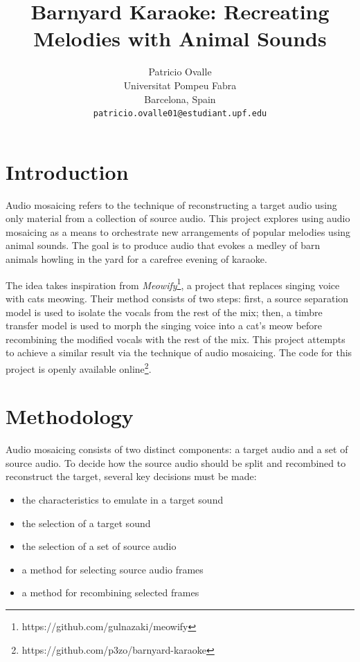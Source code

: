 \documentclass{article}
\title{Barnyard Karaoke: Recreating Melodies with Animal Sounds}
\date{}
\author{
	Patricio Ovalle \\
	Universitat Pompeu Fabra\\
	Barcelona, Spain \\
	\texttt{patricio.ovalle01@estudiant.upf.edu}
}
\begin{document}
\maketitle



\section{Introduction}

Audio mosaicing refers to the technique of reconstructing a target audio using only material from a collection of source audio.
This project explores using audio mosaicing as a means to orchestrate new arrangements of popular melodies using animal sounds.
The goal is to produce audio that evokes a medley of barn animals howling in the yard for a carefree evening of karaoke.

The idea takes inspiration from \textit{Meowify}\footnote{https://github.com/gulnazaki/meowify}, a project that replaces singing voice with cats meowing.
Their method consists of two steps: first, a source separation model is used to isolate the vocals from the rest of the mix; then, a timbre transfer model is used to morph the singing voice into a cat's meow before recombining the modified vocals with the rest of the mix.
This project attempts to achieve a similar result via the technique of audio mosaicing.
The code for this project is openly available online\footnote{https://github.com/p3zo/barnyard-karaoke}.

\section{Methodology}

Audio mosaicing consists of two distinct components: a target audio and a set of source audio.
To decide how the source audio should be split and recombined to reconstruct the target, several key decisions must be made:

\begin{itemize}
  \item the characteristics to emulate in a target sound
  \item the selection of a target sound
  \item the selection of a set of source audio
  \item a method for selecting source audio frames
  \item a method for recombining selected frames
\end{itemize}
\end{document}
